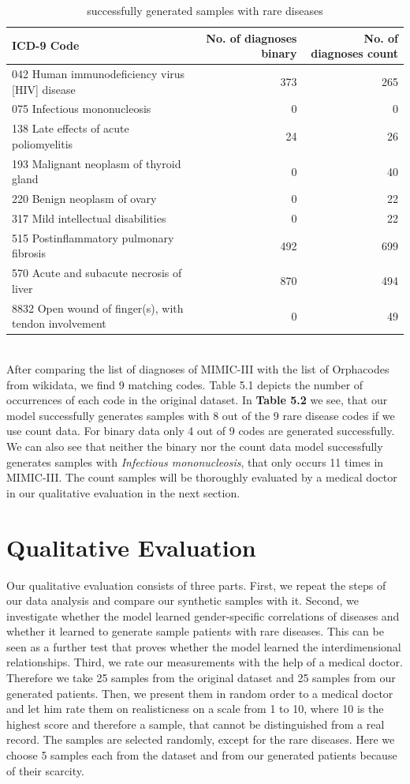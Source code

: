 \documentclass[11pt, a4paper, oneside]{book}
\begin{document}
\begin{table}
\begin{tabularx}{\textwidth}{X|r|r}
\textbf{ICD-9 Code} & \textbf{No. of diagnoses binary} & \textbf{No. of diagnoses count}\\
\hline
042 Human immunodeficiency virus [HIV] disease	& 373 & 265\\
075 Infectious mononucleosis & 0 & 0\\
138 Late effects of acute poliomyelitis & 24  & 26\\
193 Malignant neoplasm of thyroid gland & 0 & 40\\
220 Benign neoplasm of ovary & 0 & 22\\
317 Mild intellectual disabilities & 0 & 22\\
515 Postinflammatory pulmonary fibrosis & 492 & 699\\
570 Acute and subacute necrosis of liver & 870 & 494\\
8832 Open wound of finger(s), with tendon involvement & 0 & 49\\ 
\end{tabularx}
\caption{\label{tab:rare-generated}successfully generated samples with rare diseases}
\end{table}
\\
After comparing the list of diagnoses of MIMIC-III with the list of Orphacodes from wikidata, we find 9 matching codes. Table 5.1 depicts the number of occurrences of each code in the original dataset. In \textbf{Table 5.2} we see, that our model successfully generates samples with 8 out of the 9 rare disease codes if we use count data. For binary data only 4 out of 9 codes are generated successfully. We can also see that neither the binary nor the count data model successfully generates samples with \textit{Infectious mononucleosis}, that only occurs 11 times in MIMIC-III. 
The count samples will be thoroughly evaluated by a medical doctor in our qualitative evaluation in the next section.


\section{Qualitative Evaluation}
Our qualitative evaluation consists of three parts. First, we repeat the steps of our data analysis and compare our synthetic samples with it. Second, we investigate whether the model learned gender-specific correlations of diseases and whether it learned to generate sample patients with rare diseases. This can be seen as a further test that proves whether the model learned the interdimensional relationships. Third, we rate our measurements with the help of a medical doctor. Therefore we take 25 samples from the original dataset and 25 samples from our generated patients. Then, we present them in random order to a medical doctor and let him rate them on realisticness on a scale from 1 to 10, where 10 is the highest score and therefore a sample, that cannot be distinguished from a real record.
The samples are selected randomly, except for the rare diseases. Here we choose 5 samples each from the dataset and from our generated patients because of their scarcity.
\end{document}
